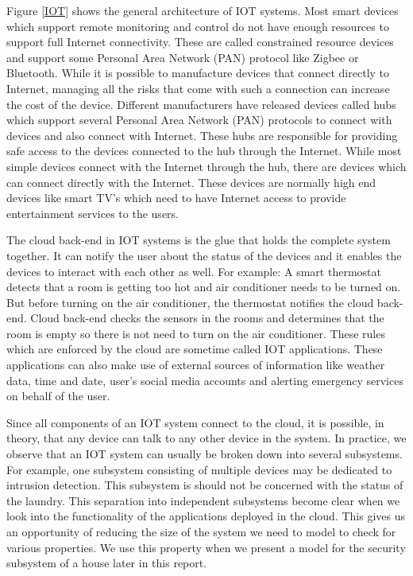 Figure \ref{IOT} shows the general architecture of IOT systems. Most smart devices which support remote monitoring and control do not have enough resources to support full Internet connectivity. These are called constrained resource devices and support some Personal Area Network (PAN) protocol like Zigbee or Bluetooth. While it is possible to manufacture devices that connect directly to Internet, managing all the risks that come with such a connection can increase the cost of the device. Different manufacturers have released devices called hubs which support several Personal Area Network (PAN) protocols to connect with devices and also connect with Internet. These hubs are responsible for providing safe access to the devices connected to the hub through the Internet. While most simple devices connect with the Internet through the hub, there are devices which can connect directly with the Internet. These devices are normally high end devices like smart TV's which need to have Internet access to provide entertainment services to the users.

The cloud back-end in IOT systems is the glue that holds the complete system together. It can notify the user about the status of the devices and it enables the devices to interact with each other as well. For example: A smart thermostat detects that a room is getting too hot and air conditioner needs to be turned on. But before turning on the air conditioner, the thermostat notifies the cloud back-end. Cloud back-end checks the sensors in the rooms and determines that the room is empty so there is not need to turn on the air conditioner. These rules which are enforced by the cloud are sometime called IOT applications. These applications can also make use of external sources of information like weather data, time and date, user's social media accounts and alerting emergency services on behalf of the user.

Since all components of an IOT system connect to the cloud, it is possible, in theory, that any device can talk to any other device in the system. In practice, we observe that an IOT system can usually be broken down into several subsystems. For example, one subsystem consisting of multiple devices may be dedicated to intrusion detection. This subsystem is should not be concerned with the status of the laundry. This separation into independent subsystems become clear when we look into the functionality of the applications deployed in the cloud. This gives us an opportunity of reducing the size of the system we need to model to check for various properties. We use this property when we present a model for the security subsystem of a house later in this report.
